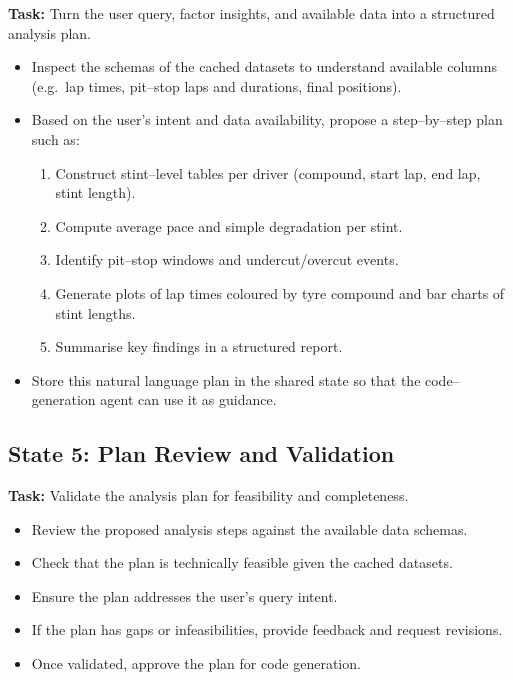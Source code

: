 \documentclass[11pt]{article}
\begin{document}
\textbf{Task:} Turn the user query, factor insights, and available data into a structured analysis plan.

\begin{itemize}[leftmargin=1.5em]
    \item Inspect the schemas of the cached datasets to understand available columns (e.g.\ lap times, pit–stop laps and durations, final positions).
    \item Based on the user's intent and data availability, propose a step–by–step plan such as:
    \begin{enumerate}[label=\arabic*., leftmargin=1.5em]
        \item Construct stint–level tables per driver (compound, start lap, end lap, stint length).
        \item Compute average pace and simple degradation per stint.
        \item Identify pit–stop windows and undercut/overcut events.
        \item Generate plots of lap times coloured by tyre compound and bar charts of stint lengths.
        \item Summarise key findings in a structured report.
    \end{enumerate}
    \item Store this natural language plan in the shared state so that the code–generation agent can use it as guidance.
\end{itemize}

\subsection*{State 5: Plan Review and Validation}

\textbf{Task:} Validate the analysis plan for feasibility and completeness.

\begin{itemize}[leftmargin=1.5em]
    \item Review the proposed analysis steps against the available data schemas.
    \item Check that the plan is technically feasible given the cached datasets.
    \item Ensure the plan addresses the user's query intent.
    \item If the plan has gaps or infeasibilities, provide feedback and request revisions.
    \item Once validated, approve the plan for code generation.
\end{itemize}
\end{document}
